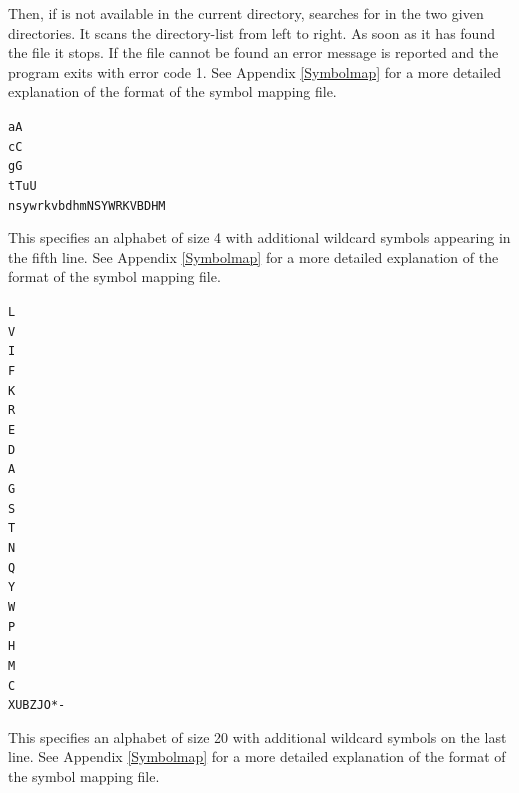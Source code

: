 \documentclass[12pt,titlepage]{article}
\newenvironment{LargeOutput}{%
 \begin{footnotesize}
 \begin{alltt}}{%
 \end{alltt}
 \end{footnotesize}%
 \addvspace{-\medskipamount}
}
\begin{document}
\begin{Showprogramwithoptionswithoutindex}{\MKV}{}
{Then, if  is not available in the current directory, 
\MKV searches for  in the two given directories. It
scans the directory-list from left to right. As soon as it has found the file
it stops. If the file cannot be found an error message is reported and
the program exits with 
error code 1. See Appendix \ref{Symbolmap}
for a more detailed explanation of the format of the symbol mapping file.
}


\begin{LargeOutput}
aA
cC
gG
tTuU
nsywrkvbdhmNSYWRKVBDHM
\end{LargeOutput}

This specifies an alphabet of size 4 with additional 
wildcard symbols appearing in the fifth line. 
See Appendix \ref{Symbolmap} for a more
detailed explanation of the format of the symbol mapping file. 

\medskip


\begin{LargeOutput}
L
V
I
F
K
R
E
D
A
G
S
T
N
Q
Y
W
P
H
M
C
XUBZJO*-
\end{LargeOutput}

This specifies an alphabet of size 20 with additional 
wildcard symbols on
the last line.  See Appendix \ref{Symbolmap} for a more detailed
explanation of the format of the symbol mapping file.

\medskip



\end{Showprogramwithoptionswithoutindex}
\end{document}
